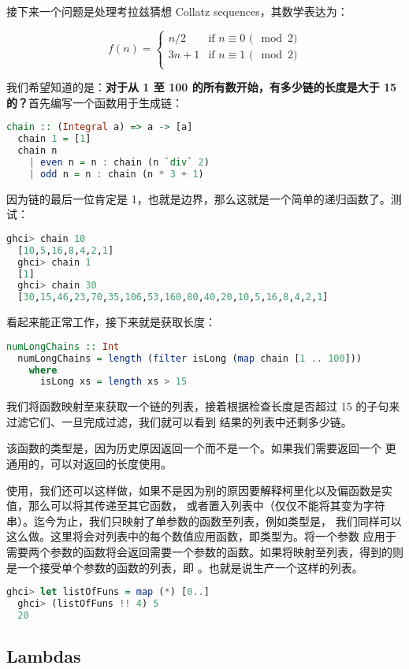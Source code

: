 \documentclass[./main.tex]{subfiles}
\begin{document}
接下来一个问题是处理考拉兹猜想 Collatz sequences，其数学表达为：

\begin{equation*}
  f(n) =
  \begin{cases}
    n / 2  & \text{if $n \equiv 0$ ($\mod 2$)} \\
    3n + 1 & \text{if $n \equiv 1$ ($\mod 2$)} \\
  \end{cases}
\end{equation*}

我们希望知道的是：\textbf{对于从 1 至 100 的所有数开始，有多少链的长度是大于 15 的？}首先编写一个函数用于生成链：

\begin{lstlisting}[language=Haskell]
  chain :: (Integral a) => a -> [a]
  chain 1 = [1]
  chain n
    | even n = n : chain (n `div` 2)
    | odd n = n : chain (n * 3 + 1)
\end{lstlisting}

因为链的最后一位肯定是 1，也就是边界，那么这就是一个简单的递归函数了。测试：

\begin{lstlisting}[language=Haskell]
  ghci> chain 10
  [10,5,16,8,4,2,1]
  ghci> chain 1
  [1]
  ghci> chain 30
  [30,15,46,23,70,35,106,53,160,80,40,20,10,5,16,8,4,2,1]
\end{lstlisting}

看起来能正常工作，接下来就是获取长度：

\begin{lstlisting}[language=Haskell]
  numLongChains :: Int
  numLongChains = length (filter isLong (map chain [1 .. 100]))
    where
      isLong xs = length xs > 15
\end{lstlisting}

我们将函数映射至\acode{[1..100]}来获取一个链的列表，接着根据检查长度是否超过 15 的子句来过滤它们、一旦完成过滤，我们就可以看到
结果的列表中还剩多少链。

\begin{anote}
  该函数的类型是，因为历史原因返回一个而不是一个。如果我们需要返回一个
  更通用的，可以对返回的长度使用。
\end{anote}

使用，我们还可以这样做，如果不是因为别的原因要解释柯里化以及偏函数是实值，那么可以将其传递至其它函数，
或者置入列表中（仅仅不能将其变为字符串）。迄今为止，我们只映射了单参数的函数至列表，例如类型是，
我们同样可以这么做。这里将会对列表中的每个数值应用函数\acode{*}，即类型为。将一个参数
应用于需要两个参数的函数将会返回需要一个参数的函数。如果将\acode{*}映射至列表\acode{[0..]}，得到的则是一个接受单个参数的函数的列表，即
。也就是说生产一个这样的列表\acode{[(0*),(1*),(2*),(3*),(4*),(5*)..]}。

\begin{lstlisting}[language=Haskell]
  ghci> let listOfFuns = map (*) [0..]
  ghci> (listOfFuns !! 4) 5
  20
\end{lstlisting}

\subsection*{Lambdas}

\end{document}
